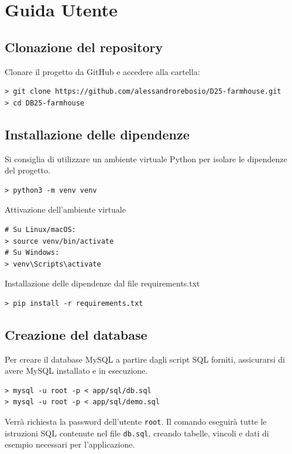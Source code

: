 \documentclass[a4paper,12pt]{report}
\begin{document}
\appendix
\chapter{Guida Utente}

\section{Clonazione del repository}
Clonare il progetto da GitHub e accedere alla cartella:

\begin{verbatim}
> git clone https://github.com/alessandrorebosio/D25-farmhouse.git
> cd DB25-farmhouse
\end{verbatim}

\section{Installazione delle dipendenze}

Si consiglia di utilizzare un ambiente virtuale Python per isolare le
dipendenze del progetto.

\begin{verbatim}
> python3 -m venv venv
\end{verbatim}

\noindent Attivazione dell'ambiente virtuale
\begin{verbatim}
# Su Linux/macOS:
> source venv/bin/activate
# Su Windows:
> venv\Scripts\activate
\end{verbatim}

\noindent Installazione delle dipendenze dal file requirements.txt
\begin{verbatim}
> pip install -r requirements.txt
\end{verbatim}

\section{Creazione del database}
Per creare il database MySQL a partire dagli script SQL forniti,
assicurarsi di avere MySQL
installato e in esecuzione.

\begin{verbatim}
> mysql -u root -p < app/sql/db.sql
> mysql -u root -p < app/sql/demo.sql
\end{verbatim}

Verrà richiesta la password dell'utente \texttt{root}. Il comando
eseguirà tutte le
istruzioni SQL contenute nel file \texttt{db.sql}, creando tabelle,
vincoli e dati di
esempio necessari per l'applicazione.
\end{document}
